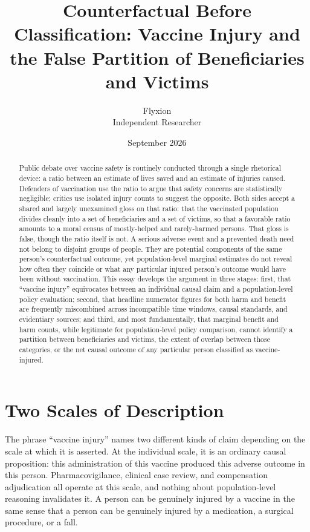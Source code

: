 \documentclass[11pt]{article}
\title{\textbf{Counterfactual Before Classification: Vaccine Injury and the False Partition of Beneficiaries and Victims}}
\author{Flyxion \\ Independent Researcher}
\date{September 2026}
\begin{document}
\maketitle

\begin{abstract}
Public debate over vaccine safety is routinely conducted through a single rhetorical device: a ratio between an estimate of lives saved and an estimate of injuries caused. Defenders of vaccination use the ratio to argue that safety concerns are statistically negligible; critics use isolated injury counts to suggest the opposite. Both sides accept a shared and largely unexamined gloss on that ratio: that the vaccinated population divides cleanly into a set of beneficiaries and a set of victims, so that a favorable ratio amounts to a moral census of mostly-helped and rarely-harmed persons. That gloss is false, though the ratio itself is not. A serious adverse event and a prevented death need not belong to disjoint groups of people. They are potential components of the same person's counterfactual outcome, yet population-level marginal estimates do not reveal how often they coincide or what any particular injured person's outcome would have been without vaccination. This essay develops the argument in three stages: first, that ``vaccine injury'' equivocates between an individual causal claim and a population-level policy evaluation; second, that headline numerator figures for both harm and benefit are frequently miscombined across incompatible time windows, causal standards, and evidentiary sources; and third, and most fundamentally, that marginal benefit and harm counts, while legitimate for population-level policy comparison, cannot identify a partition between beneficiaries and victims, the extent of overlap between those categories, or the net causal outcome of any particular person classified as vaccine-injured.
\end{abstract}

\section{Two Scales of Description}

The phrase ``vaccine injury'' names two different kinds of claim depending on the scale at which it is asserted. At the individual scale, it is an ordinary causal proposition: this administration of this vaccine produced this adverse outcome in this person. Pharmacovigilance, clinical case review, and compensation adjudication all operate at this scale, and nothing about population-level reasoning invalidates it. A person can be genuinely injured by a vaccine in the same sense that a person can be genuinely injured by a medication, a surgical procedure, or a fall.
\end{document}
